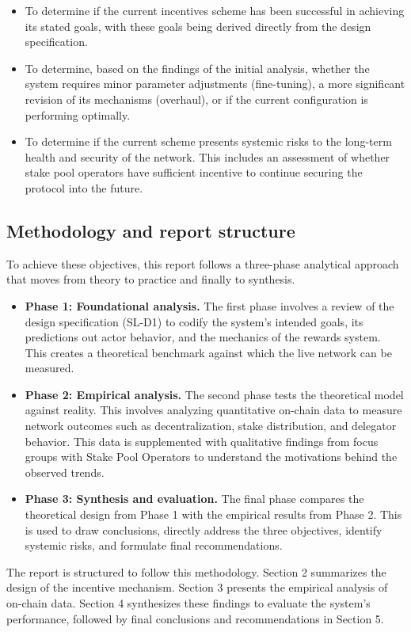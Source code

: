 \documentclass[11pt, letterpaper]{article}
\begin{document}
\begin{itemize}
	\item To determine if the current incentives scheme has been successful in achieving
	      its stated goals, with these goals being derived directly from the design
	      specification.
	\item To determine, based on the findings of the initial analysis, whether the system
	      requires minor parameter adjustments (fine-tuning), a more significant revision
	      of its mechanisms (overhaul), or if the current configuration is performing
	      optimally.
	\item To determine if the current scheme presents systemic risks to the long-term
	      health and security of the network. This includes an assessment of whether
	      stake pool operators have sufficient incentive to continue securing the
	      protocol into the future.
\end{itemize}

\subsection{Methodology and report structure}
To achieve these objectives, this report follows a three-phase analytical
approach that moves from theory to practice and finally to synthesis.
\begin{itemize}
	\item \textbf{Phase 1: Foundational analysis.} The first phase involves a review of the design
	      specification (SL-D1) to codify the system's intended goals, its predictions out actor behavior, and
	      the mechanics of the rewards system. This creates a theoretical benchmark against which the live
	      network can be measured.
	\item \textbf{Phase 2: Empirical analysis.} The second phase tests the theoretical model against reality.
	      This involves analyzing quantitative on-chain data to measure network outcomes such as decentralization,
	      stake distribution, and delegator behavior. This data is supplemented with qualitative findings from
	      focus groups with Stake Pool Operators to understand the motivations behind the observed trends.
	\item \textbf{Phase 3: Synthesis and evaluation.} The final phase compares the theoretical design from
	      Phase 1 with the empirical results from Phase 2. This is used to draw conclusions, directly address
	      the three objectives, identify systemic risks, and formulate final recommendations.
\end{itemize}
The report is structured to follow this methodology. Section 2 summarizes the design of the incentive
mechanism. Section 3 presents the empirical analysis of on-chain data. Section 4 synthesizes these findings
to evaluate the system's performance, followed by final conclusions and recommendations in Section 5.
\end{document}
